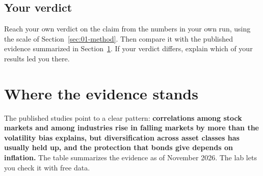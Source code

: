 \subsection*{Your verdict}

Reach your own verdict on the claim from the numbers in your own run, using the scale of Section~\ref{sec:01-method}. Then compare it with the published evidence summarized in Section~\ref{sec:13-verdict}. If your verdict differs, explain which of your results led you there.

\section{Where the evidence stands}
\label{sec:13-verdict}

The published studies point to a clear pattern: \textbf{correlations among stock markets and among industries rise in falling markets by more than the volatility bias explains, but diversification across asset classes has usually held up, and the protection that bonds give depends on inflation.} The table summarizes the evidence as of November 2026. The lab lets you check it with free data.

